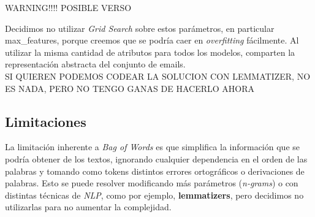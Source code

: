 {\Large WARNING!!!! POSIBLE VERSO}

Decidimos no utilizar \textit{Grid Search} sobre estos parámetros, en particular max\_features, porque creemos que se podría caer en \textit{overfitting} fácilmente. Al utilizar la misma cantidad de atributos para todos los modelos, comparten la representación abstracta del conjunto de emails.\\

{\Large SI QUIEREN PODEMOS CODEAR LA SOLUCION CON LEMMATIZER, NO ES NADA, PERO NO TENGO GANAS DE HACERLO AHORA}
\subsection{Limitaciones}
La limitación inherente a \textit{Bag of Words} es que simplifica la información que se podría obtener de los textos, ignorando cualquier dependencia en el orden de las palabras y tomando como tokens distintos errores ortográficos o derivaciones de palabras. Esto se puede resolver modificando más parámetros (\textit{n-grams}) o con distintas técnicas de \textit{NLP}, como por ejemplo, \textbf{lemmatizers}, pero decidimos no utilizarlas para no aumentar la complejidad.
